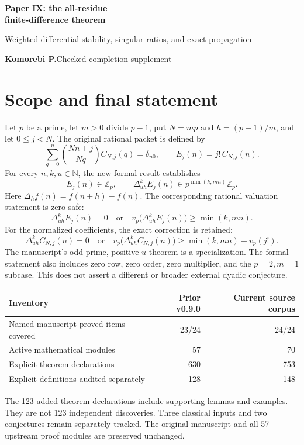 \documentclass[11pt]{article}
\newcommand{\Z}{\mathbb Z}\newcommand{\Q}{\mathbb Q}\newcommand{\N}{\mathbb N}
\begin{document}
{\LARGE\bfseries Paper IX: the all-residue\\[3pt]finite-difference theorem}\par
{\large Weighted differential stability, singular ratios, and exact propagation}\par
\textbf{Komorebi P.}\hfill Checked completion supplement

\section*{Scope and final statement}
Let $p$ be a prime, let $m>0$ divide $p-1$, put $N=mp$ and $h=(p-1)/m$, and let $0\le j<N$. The original rational packet is defined by
\[
 \sum_{q=0}^{n}\binom{Nn+j}{Nq}C_{N,j}(q)=\delta_{n0},
 \qquad E_j(n)=j!\,C_{N,j}(n).
\]
For every $n,k,u\in\N$, the new formal result establishes
\[
 \boxed{E_j(n)\in\Z_p,\qquad
 \Delta_{uh}^{k}E_j(n)\in p^{\min(k,mn)}\Z_p.}
\]
Here $\Delta_h f(n)=f(n+h)-f(n)$. The corresponding rational valuation statement is zero-safe:
\[
 \Delta_{uh}^{k}E_j(n)=0\quad\text{or}\quad
 v_p\bigl(\Delta_{uh}^{k}E_j(n)\bigr)\ge\min(k,mn).
\]
For the normalized coefficients, the exact correction is retained:
\[
 \boxed{\Delta_{uh}^{k}C_{N,j}(n)=0\quad\text{or}\quad
 v_p\bigl(\Delta_{uh}^{k}C_{N,j}(n)\bigr)\ge\min(k,mn)-v_p(j!).}
\]
The manuscript's odd-prime, positive-$u$ theorem is a specialization. The formal statement also includes zero row, zero order, zero multiplier, and the $p=2,m=1$ subcase. This does not assert a different or broader external dyadic conjecture.

\begin{center}\begin{tabular}{lrr}\toprule
Inventory & Prior v0.9.0 & Current source corpus\\\midrule
Named manuscript-proved items covered &23/24&24/24\\
Active mathematical modules &57&70\\
Explicit theorem declarations &630&753\\
Explicit definitions audited separately &128&148\\\bottomrule
\end{tabular}\end{center}
The 123 added theorem declarations include supporting lemmas and examples. They are not 123 independent discoveries. Three classical inputs and two conjectures remain separately tracked. The original manuscript and all 57 upstream proof modules are preserved unchanged.
\end{document}
